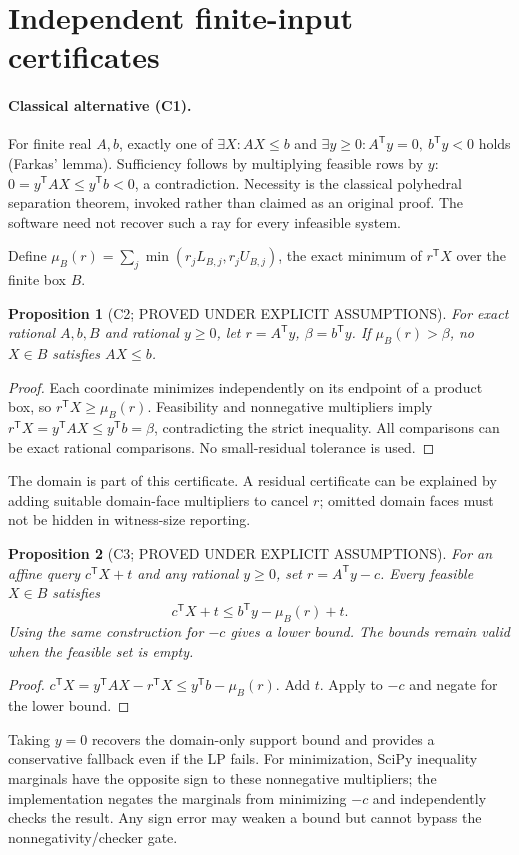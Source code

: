 \documentclass[11pt]{article}
\newtheorem{proposition}{Proposition}
\begin{document}
\section*{Independent finite-input certificates}
\paragraph{Classical alternative (C1).}
For finite real $A,b$, exactly one of $\exists X:AX\le b$ and $\exists y\ge0:A^{\mathsf T}y=0,\ b^{\mathsf T}y<0$ holds (Farkas' lemma). Sufficiency follows by multiplying feasible rows by $y$: $0=y^{\mathsf T}AX\le y^{\mathsf T}b<0$, a contradiction. Necessity is the classical polyhedral separation theorem, invoked rather than claimed as an original proof. The software need not recover such a ray for every infeasible system.

Define $\mu_B(r)=\sum_j\min(r_jL_{B,j},r_jU_{B,j})$, the exact minimum of $r^{\mathsf T}X$ over the finite box $B$.
\begin{proposition}[C2; PROVED UNDER EXPLICIT ASSUMPTIONS]
For exact rational $A,b,B$ and rational $y\ge0$, let $r=A^{\mathsf T}y$, $\beta=b^{\mathsf T}y$. If $\mu_B(r)>\beta$, no $X\in B$ satisfies $AX\le b$.
\end{proposition}
\begin{proof}
Each coordinate minimizes independently on its endpoint of a product box, so $r^{\mathsf T}X\ge\mu_B(r)$. Feasibility and nonnegative multipliers imply $r^{\mathsf T}X=y^{\mathsf T}AX\le y^{\mathsf T}b=\beta$, contradicting the strict inequality. All comparisons can be exact rational comparisons. No small-residual tolerance is used.
\end{proof}
The domain is part of this certificate. A residual certificate can be explained by adding suitable domain-face multipliers to cancel $r$; omitted domain faces must not be hidden in witness-size reporting.

\begin{proposition}[C3; PROVED UNDER EXPLICIT ASSUMPTIONS]
For an affine query $c^{\mathsf T}X+t$ and any rational $y\ge0$, set $r=A^{\mathsf T}y-c$. Every feasible $X\in B$ satisfies
\[c^{\mathsf T}X+t\le b^{\mathsf T}y-\mu_B(r)+t.\]
Using the same construction for $-c$ gives a lower bound. The bounds remain valid when the feasible set is empty.
\end{proposition}
\begin{proof}
$c^{\mathsf T}X=y^{\mathsf T}AX-r^{\mathsf T}X\le y^{\mathsf T}b-\mu_B(r)$. Add $t$. Apply to $-c$ and negate for the lower bound.
\end{proof}
Taking $y=0$ recovers the domain-only support bound and provides a conservative fallback even if the LP fails. For minimization, SciPy inequality marginals have the opposite sign to these nonnegative multipliers; the implementation negates the marginals from minimizing $-c$ and independently checks the result. Any sign error may weaken a bound but cannot bypass the nonnegativity/checker gate.
\end{document}
